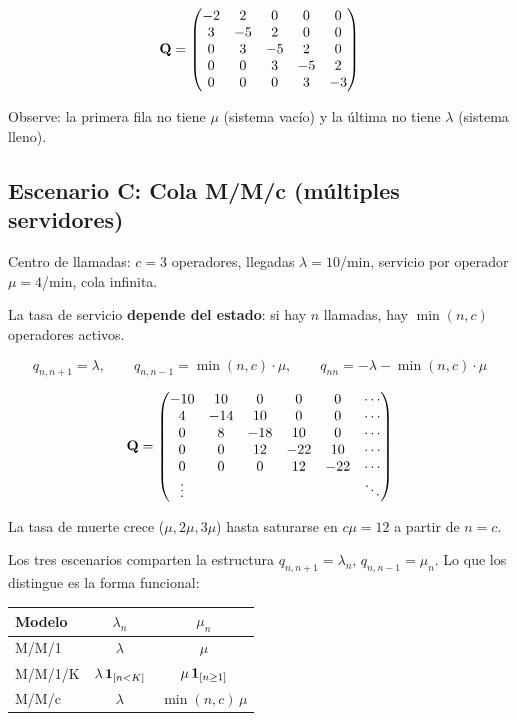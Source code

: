 \documentclass[11pt, letterpaper]{article}
\begin{document}
\[
\mathbf{Q}=\begin{pmatrix}-2&2&0&0&0\\3&-5&2&0&0\\0&3&-5&2&0\\0&0&3&-5&2\\0&0&0&3&-3\end{pmatrix}
\]

Observe: la primera fila no tiene $\mu$ (sistema vac\'io) y la \'ultima no tiene $\lambda$ (sistema lleno).

\subsection{Escenario C: Cola M/M/c (m\'ultiples servidores)}

\begin{ejemplobox}[Enunciado]
Centro de llamadas: $c=3$ operadores, llegadas $\lambda=10$/min, servicio por operador $\mu=4$/min, cola infinita.
\end{ejemplobox}

La tasa de servicio \textbf{depende del estado}: si hay $n$ llamadas, hay $\min(n,c)$ operadores activos.

\[
q_{n,n+1}=\lambda, \qquad q_{n,n-1}=\min(n,c)\cdot\mu, \qquad q_{nn}=-\lambda-\min(n,c)\cdot\mu
\]

\[
\mathbf{Q}=\begin{pmatrix}-10&10&0&0&0&\cdots\\4&-14&10&0&0&\cdots\\0&8&-18&10&0&\cdots\\0&0&12&-22&10&\cdots\\0&0&0&12&-22&\cdots\\\vdots&&&&&\ddots\end{pmatrix}
\]

La tasa de muerte crece ($\mu, 2\mu, 3\mu$) hasta saturarse en $c\mu=12$ a partir de $n=c$.

\begin{notabox}
Los tres escenarios comparten la estructura $q_{n,n+1}=\lambda_n$, $q_{n,n-1}=\mu_n$. Lo que los distingue es la forma funcional:
\begin{center}\small
\begin{tabular}{lcc}\toprule
\textbf{Modelo} & $\lambda_n$ & $\mu_n$ \\\midrule
M/M/1 & $\lambda$ & $\mu$ \\
M/M/1/K & $\lambda\,\mathbf{1}_{[n<K]}$ & $\mu\,\mathbf{1}_{[n\ge1]}$ \\
M/M/c & $\lambda$ & $\min(n,c)\,\mu$ \\\bottomrule
\end{tabular}
\end{center}
\end{notabox}
\end{document}
